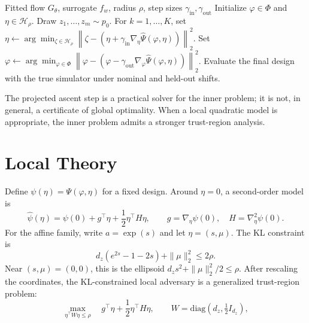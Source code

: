 \documentclass[11pt]{article}
\newcommand{\Phibox}{\Phi}
\newcommand{\design}{\varphi}
\newcommand{\surr}{f_w}
\begin{document}
\begin{algorithm}[ht]
\caption{Latent-DRO with a differentiable surrogate}
\label{alg:latent-dro}
\begin{algorithmic}[1]
\REQUIRE Fitted flow $G_\theta$, surrogate $\surr$, radius $\rho$, step sizes
$\gamma_{\mathrm{in}},\gamma_{\mathrm{out}}$
\STATE Initialize $\design\in\Phibox$ and $\eta\in\mathcal{H}_\rho$.
  \STATE Draw $z_1,\ldots,z_m\sim p_0$.
  \STATE For $k=1,\ldots,K$, set
  $\eta\leftarrow\arg\min_{\zeta\in\mathcal{H}_\rho}
  \left\|\zeta-\left(\eta+\gamma_{\mathrm{in}}\nabla_\eta
  \widehat\Psi(\design,\eta)\right)\right\|_2^2$.
  \STATE Set
  $\design\leftarrow\arg\min_{\varphi\in\Phibox}
  \left\|\varphi-\left(\design-\gamma_{\mathrm{out}}\nabla_\design
  \widehat\Psi(\design,\eta)\right)\right\|_2^2$.
\ENDWHILE
\STATE Evaluate the final design with the true simulator under nominal and held-out shifts.
\end{algorithmic}
\end{algorithm}

The projected ascent step is a practical solver for the inner problem; it is not, in general,
a certificate of global optimality. When a local quadratic model is appropriate, the inner
problem admits a stronger trust-region analysis.

\section{Local Theory}
\label{sec:theory}

Define $\psi(\eta)=\Psi(\design,\eta)$ for a fixed design. Around $\eta=0$, a second-order
model is
\begin{equation}
  \label{eq:taylor}
  \widehat\psi(\eta)=\psi(0)+g^\top\eta+\frac{1}{2}\eta^\top H\eta,
  \qquad g=\nabla_\eta\psi(0),\quad H=\nabla^2_\eta\psi(0).
\end{equation}
For the affine family, write $a=\exp(s)$ and let $\eta=(s,\mu)$. The KL constraint is
\begin{equation}
  \label{eq:affine-local-constraint}
  d_z(e^{2s}-1-2s)+\|\mu\|_2^2\leq 2\rho.
\end{equation}
Near $(s,\mu)=(0,0)$, this is the ellipsoid $d_zs^2+\|\mu\|_2^2/2\leq\rho$.
After rescaling the coordinates, the KL-constrained local adversary is a generalized
trust-region problem:
\begin{equation}
  \label{eq:trs}
  \max_{\eta^\top W\eta\leq\rho}\quad g^\top\eta+\frac{1}{2}\eta^\top H\eta,
  \qquad W=\mathrm{diag}(d_z,\tfrac12 I_{d_z}),
\end{equation}
\end{document}
